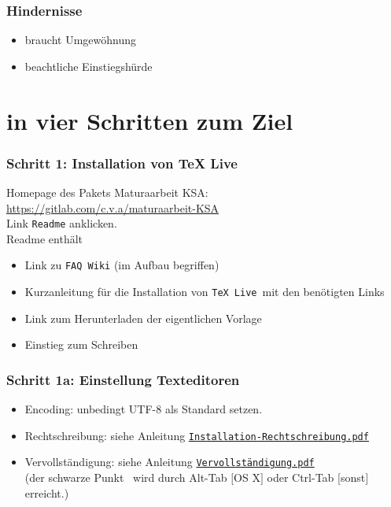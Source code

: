 \documentclass[11pt,german,aspectratio=169]{beamer}
\def\myColor{blue!80!white!70!green}                %
\newcommand{\thisColor}[1]{{\color{\myColor}#1}}    %
\newcommand{\grey}[1]{{\color{black!60}#1}}         %
\newcommand{\tttc}[1]{{\tt\thisColor{#1}}}          %
\newcommand{\ttgr}[1]{{\tt\grey{#1}}}               %
\begin{document}
\frame
{
	\frametitle{Hindernisse}
\begin{itemize}
	\item braucht Umgewöhnung
	\item beachtliche Einstiegshürde
\end{itemize}


}

\section{in vier Schritten zum Ziel}
\frame
{
	\frametitle{Schritt 1: Installation von TeX Live}
	
	Homepage des Pakets Maturaarbeit KSA: \\
	\vspace{2ex}
	\url{https://gitlab.com/c.v.a/maturaarbeit-KSA} \\
	\vspace{1ex}	
	Link \ttgr{Readme} anklicken.\\
	\vspace{2ex}
	Readme enthält
	
	\begin{itemize}
		\item Link zu \ttgr{FAQ Wiki} (im Aufbau begriffen)
		\item Kurzanleitung für die Installation von \tttc{TeX Live}\ mit den benötigten Links
		\item Link zum Herunterladen der eigentlichen Vorlage
		\item Einstieg zum Schreiben
	\end{itemize}
	
}
\frame
{
	\frametitle{Schritt 1a: Einstellung Texteditoren}
	\begin{itemize}
		\item Encoding: unbedingt UTF-8 als Standard setzen.
		\item Rechtschreibung: siehe Anleitung \href{run:Installation-Rechtschreibung.pdf}{\tttc{Installation-Rechtschreibung.pdf}}
		\item Vervollständigung: siehe Anleitung \href{run:Vervollständigung.pdf}{\tttc {Vervollständigung.pdf}}\\
		(der schwarze Punkt \textbullet\ wird durch Alt-Tab $[$OS X$]$ oder Ctrl-Tab $[$sonst$]$ erreicht.)
	\end{itemize}
}
\frame
\end{document}
